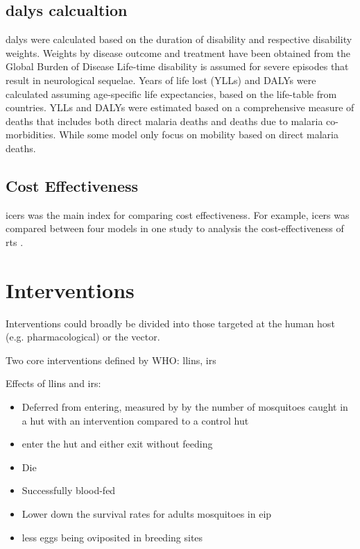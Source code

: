 \documentclass[a4paper, 12pt, twoside]{article}
\begin{document}
\subsection{\gls{dalys} calcualtion}%
\label{sub:dalys_calcualtion}
\gls{dalys} were calculated based on the duration of disability and respective disability weights.
Weights by disease outcome and treatment have been obtained from the Global Burden of Disease Life-time disability is assumed for severe episodes that result in neurological sequelae.
Years of life lost (YLLs) and DALYs were calculated assuming age-specific life expectancies, based on the life-table from countries.
YLLs and DALYs were estimated based on a comprehensive measure of deaths that includes both direct malaria deaths and deaths due to malaria co-morbidities.
While some model only focus on mobility based on direct malaria deaths.

\subsection{Cost Effectiveness}%
\label{sub:cost_effectiveness}
\gls{icers} was the main index for comparing cost effectiveness.
For example, \gls{icers} was compared between four models in one study to analysis the cost-effectiveness of \gls{rts} \cite{Hay2004}.

\section{Interventions}
Interventions could broadly be divided into those targeted at the human host (e.g. pharmacological) or the vector.

Two core interventions defined by WHO: \gls{llins}, \gls{irs}

Effects of \gls{llins} and \gls{irs}:

\begin{itemize}
	\item Deferred from entering, measured by by the number of mosquitoes caught in a hut with an intervention compared to a control hut
	\item enter the hut and either exit without feeding
	\item Die
	\item Successfully blood-fed
	\item Lower down the survival rates for adults mosquitoes in \gls{eip}
	\item less eggs being oviposited in breeding sites
\end{itemize}
\end{document}

